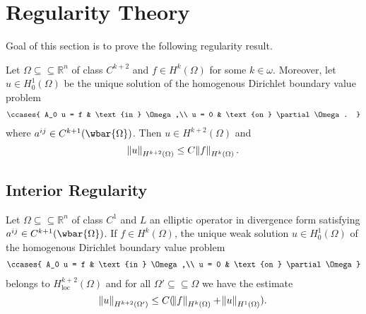 \section*{Regularity Theory}

Goal of this section is to prove the following regularity result.

\begin{theorem}
	\label{thm:regularity}
	Let $\Omega \subseteq \subseteq \mathbb{R}^n$ of class $C^{k + 2}$ and $f \in H^k(\Omega)$ for some $k \in \omega$. Moreover, let $u \in H^1_0(\Omega)$ be the unique solution of the homogenous Dirichlet boundary value problem
	\begin{align*}
		\ccases{
			A_0 u = f & \text{in } \Omega,\\
			u = 0 & \text{on } \partial \Omega.
		}
	\end{align*}
	\noindent where $a^{ij} \in C^{k + 1}(\wbar{\Omega})$. Then $u \in H^{k + 2}(\Omega)$ and 
	\begin{equation*}
		\norm{u}_{H^{k + 2}(\Omega)} \leq C\norm{f}_{H^k(\Omega)}.
	\end{equation*}
\end{theorem}

\subsection*{Interior Regularity}

\begin{theorem}
	Let $\Omega \subseteq \subseteq \mathbb{R}^n$ of class $C^1$ and $L$ an elliptic operator in divergence form satisfying $a^{ij} \in C^{k + 1}(\wbar{\Omega})$. If $f \in H^k(\Omega)$, the unique weak solution $u \in H^1_0(\Omega)$ of the homogenous Dirichlet boundary value problem
	\begin{align*}
		\ccases{
			A_0 u = f & \text{in } \Omega,\\
			u = 0 & \text{on } \partial\Omega
		}
	\end{align*}
	\noindent belongs to $H^{k + 2}_{\mathrm{loc}}(\Omega)$ and for all $\Omega' \subseteq \subseteq \Omega$ we have the estimate
	\begin{equation*}
		\norm{u}_{H^{k + 2}(\Omega')} \leq C(\norm{f}_{H^k(\Omega)} + \norm{u}_{H^1(\Omega)}).
	\end{equation*}
\end{theorem}

